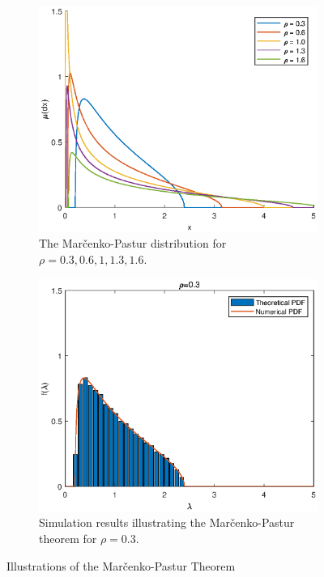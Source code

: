 \begin{figure}[htbp]
	\centering
	\begin{subfigure}{.45\linewidth}
		\includegraphics[width=\textwidth]{random-matrix-theory/figures/marchenko-pastur-distribution.eps}
		\caption{The Mar\v{c}enko-Pastur distribution for \(\rho=0.3,0.6,1,1.3,1.6\).}
	\end{subfigure}
	\begin{subfigure}{.45\linewidth}
		\includegraphics[width=\textwidth]{random-matrix-theory/figures/marchenko-pastur-theorem-simulation.eps}
		\caption{Simulation results illustrating the Mar\v{c}enko-Pastur theorem for \(\rho=0.3\).}
	\end{subfigure}
	\caption{Illustrations of the Mar\v{c}enko-Pastur Theorem}
\end{figure}


